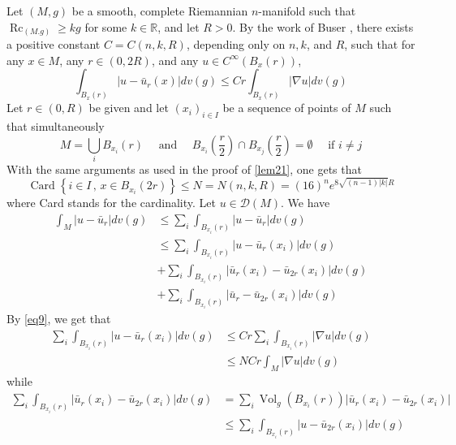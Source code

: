 \documentclass[12pt,hyperref,a4paper,UTF8]{ctexart}
\begin{document}
\begin{Proof}
Let $(M, g)$ be a smooth, complete Riemannian $n$-manifold such that $\operatorname{Rc}_{(M . g)} \geq k g$ for some $k \in \mathbb{R}$, and let $R>0$. By the work of Buser \cite{Buser}, there exists a positive constant $C=C(n, k, R)$, depending only on $n, k$, and $R$, such that for any $x \in M$, any $r \in(0,2 R)$, and any $u \in C^{\infty}\left(B_x(r)\right)$,
\begin{equation}
\int_{B_x(r)}\left|u-\bar{u}_r(x)\right| d v(g) \leq C r \int_{B_{x}(r)}|\nabla u| d v(g)
\label{eq9}
\end{equation}
Let $r \in(0, R)$ be given and let $\left(x_i\right)_{i \in I}$ be a sequence of points of $M$ such that simultaneously
$$
M=\bigcup_i B_{x_i}(r) \quad \text { and } \quad B_{x_i}\left(\frac{r}{2}\right) \cap B_{x_j}\left(\frac{r}{2}\right)=\emptyset \quad \text { if } i \neq j
$$
With the same arguments as used in the proof of \autoref{lem21}, one gets that
$$
\operatorname{Card}\left\{i \in I \,,\, x \in B_{x_i}(2 r)\right\} \leq N=N(n, k, R)=(16)^n e^{8 \sqrt{(n-1)|k|} R}
$$
where Card stands for the cardinality. Let $u \in \mathcal{D}(M)$. We have
$$
\begin{aligned}
\int_M\left|u-\bar{u}_r\right| d v(g) &\leq  \sum_i \int_{B_{x_i}(r)}\left|u-\bar{u}_r\right| d v(g) \\
&\leq  \sum_i \int_{B_{x_i}(r)}\left|u-\bar{u}_r\left(x_i\right)\right| d v(g) \\
& +\sum_i \int_{B_{x_i}(r)}\left|\bar{u}_r\left(x_i\right)-\bar{u}_{2 r}\left(x_i\right)\right| d v(g) \\
& +\sum_i \int_{B_{x_i}(r)}\left|\bar{u}_r-\bar{u}_{2 r}\left(x_i\right)\right| d v(g)
\end{aligned}
$$
By \autoref{eq9}, we get that
$$
\begin{aligned}
\sum_i \int_{B_{x_i}(r)}\left|u-\bar{u}_r\left(x_i\right)\right| d v(g) & \leq C r \sum_i \int_{B_{x_i}(r)}|\nabla u| d v(g) \\
& \leq N C r \int_M|\nabla u| d v(g)
\end{aligned}
$$
while
$$
\begin{aligned}
\sum_i \int_{B_{x_i}(r)}\left|\bar{u}_r\left(x_i\right)-\bar{u}_{2 r}\left(x_i\right)\right| d v(g) & =\sum_i \operatorname{Vol}_g\left(B_{x_i}(r)\right)\left|\bar{u}_r\left(x_i\right)-\bar{u}_{2 r}\left(x_i\right)\right| \\
& \leq \sum_i \int_{B_{x_i}(r)}\left|u-\bar{u}_{2 r}\left(x_i\right)\right| d v(g) \\

\end{aligned}$$
\end{Proof}
\end{document}
